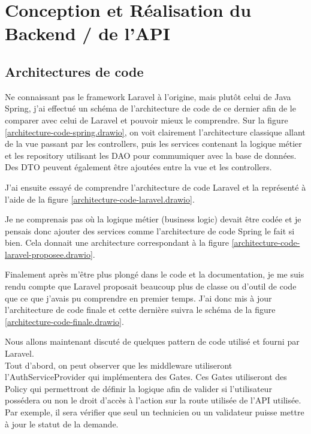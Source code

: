 \documentclass[
    iai, %
    il, %
]{heig-tb}
\begin{document}
\chapter{Conception et Réalisation du Backend / de l'API}

\section{Architectures de code}

Ne connaissant pas le framework Laravel à l'origine, mais plutôt celui de Java Spring, j'ai effectué
un schéma de l'architecture de code de ce dernier afin de le comparer avec celui de Laravel et
pouvoir mieux le comprendre. Sur la figure \ref{architecture-code-spring.drawio}, on voit clairement
l'architecture classique allant de la vue passant par les controllers, puis les services contenant
la logique métier et les repository utilisant les DAO pour commumiquer avec la base de données. \\
Des DTO peuvent également être ajoutées entre la vue et les controllers.


J'ai ensuite essayé de comprendre l'architecture de code Laravel et la représenté à l'aide de la
figure \ref{architecture-code-laravel.drawio}.


Je ne comprenais pas où la logique métier (business logic) devait être codée et je pensais donc
ajouter des services comme l'architecture de code Spring le fait si bien. Cela donnait une
architecture correspondant à la figure \ref{architecture-code-laravel-proposee.drawio}.


Finalement après m'être plus plongé dans le code et la documentation, je me suis rendu compte que
Laravel proposait beaucoup plus de classe ou d'outil de code que ce que j'avais pu comprendre en
premier temps. J'ai donc mis à jour l'architecture de code finale et cette dernière suivra le schéma
de la figure \ref{architecture-code-finale.drawio}.

Nous allons maintenant discuté de quelques pattern de code utilisé et fourni par Laravel.\\
Tout d'abord, on peut observer que les middleware utiliseront l'AuthServiceProvider qui
implémentera des Gates. Ces Gates utiliseront des Policy qui permettront de définir la logique afin
de valider si l'utilisateur possédera ou non le droit d'accès à l'action sur la route utilisée de
l'API utilisée. Par exemple, il sera vérifier que seul un technicien ou un validateur puisse mettre
à jour le statut de la demande.
\end{document}
